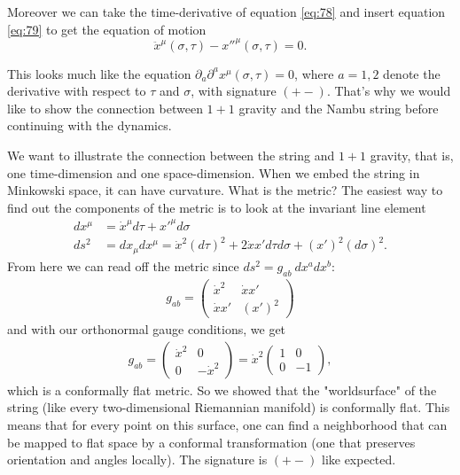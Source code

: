 Moreover we can take the time-derivative of equation \eqref{eq:78} and insert equation \eqref{eq:79} to get the equation of motion
\begin{equation}\label{eq:eom}
\ddot{x}^{\mu}(\sigma, \tau) - x''^{\mu}(\sigma, \tau) = 0.
\end{equation}

This looks much like the equation $\partial_a \partial^a x^{\mu}(\sigma, \tau) = 0$, where $a = 1,2$ denote the derivative with respect to $\tau$ and $\sigma$, with signature $(+ -)$. That's why we would like to show the connection between $1+1$ gravity and the Nambu string before continuing with the dynamics. 

\begin{example}[$1+1$ Gravity] 
We want to illustrate the connection between the string and $1+1$ gravity, that is, one time-dimension and one space-dimension.
When we embed the string in Minkowski space, it can have curvature. What is the metric? 
The easiest way to find out the components of the metric is to look at the invariant line element  
\begin{align}
dx^{\mu} &= \dot{x}^{\mu} d\tau + x'^{\mu} d\sigma \\
ds^2 &= dx_{\mu}dx^{\mu} = \dot{x}^2 (d\tau)^2 + 2 \dot{x} x' d\tau d\sigma + (x')^2 (d\sigma)^2.
\end{align}
From here we can read off the metric since $ds^2 = g_{ab} \ dx^a dx^b$:
\begin{align}
g_{ab} = 
\begin{pmatrix}
    \dot{x}^2 & \dot{x} x' \\
    \dot{x} x' & (x')^2
  \end{pmatrix}
\end{align}
and with our orthonormal gauge conditions, we get
\begin{align}
g_{ab} = 
\begin{pmatrix}
    \dot{x}^2 & 0 \\
    0 & - \dot{x}^2
  \end{pmatrix}
= \dot{x}^2
\begin{pmatrix}
    1 & 0 \\
    0 & -1
  \end{pmatrix},
\end{align}
which is a conformally flat metric.
So we showed that the "worldsurface" of the string (like every two-dimensional Riemannian manifold) is conformally flat. This means that for every point on this surface, one can find a neighborhood that can be mapped to flat space by a conformal transformation (one that preserves orientation and angles locally). 
The signature is $(+ -)$ like expected.


\end{example}
